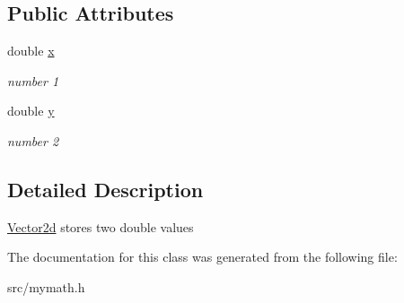 \subsection*{Public Attributes}
\begin{DoxyCompactItemize}
\item 
\mbox{\label{classCPlantBox_1_1Vector2d_abd6aba83dd662246b676ea193ec2c067}} 
double \hyperlink{classCPlantBox_1_1Vector2d_abd6aba83dd662246b676ea193ec2c067}{x}
\begin{DoxyCompactList}\small\item\em number 1 \end{DoxyCompactList}\item 
\mbox{\label{classCPlantBox_1_1Vector2d_afd56cd92f6d9ecd6b577725628006a22}} 
double \hyperlink{classCPlantBox_1_1Vector2d_afd56cd92f6d9ecd6b577725628006a22}{y}
\begin{DoxyCompactList}\small\item\em number 2 \end{DoxyCompactList}\end{DoxyCompactItemize}


\subsection{Detailed Description}
\hyperlink{classCPlantBox_1_1Vector2d}{Vector2d} stores two double values 

The documentation for this class was generated from the following file\+:\begin{DoxyCompactItemize}
\item 
src/mymath.\+h\end{DoxyCompactItemize}
